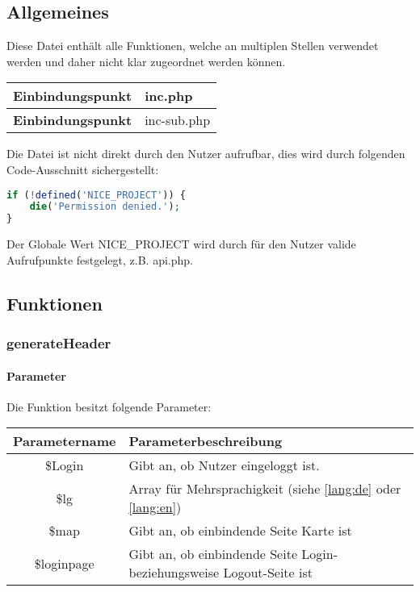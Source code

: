 \subsection{Allgemeines} Diese Datei enthält alle Funktionen, welche an multiplen Stellen verwendet werden und daher nicht klar zugeordnet werden können.
\begin{table}[H]
	\begin{tabular}{|c|p{11cm}|}
		\hline
		\textbf{Einbindungspunkt} & inc.php \\ \hline
		\textbf{Einbindungspunkt} & inc-sub.php \\ \hline
	\end{tabular}
\end{table}
Die Datei ist nicht direkt durch den Nutzer aufrufbar, dies wird durch folgenden Code-Ausschnitt sichergestellt:
\begin{lstlisting}[language=php]
if (!defined('NICE_PROJECT')) {
	die('Permission denied.');
}
\end{lstlisting}
Der Globale Wert {\glqq NICE\_PROJECT\grqq} wird durch für den Nutzer valide Aufrufpunkte festgelegt, z.B. {\glqq api.php\grqq}.
\newpage
\subsection{Funktionen}
\subsubsection{generateHeader}
\paragraph{Parameter} Die Funktion besitzt folgende Parameter:
\begin{table}[H]
	\begin{tabular}{|c|p{11cm}|}
		\hline
		\textbf{Parametername} & \textbf{Parameterbeschreibung} \\ \hline
		\$Login     & Gibt an, ob Nutzer eingeloggt ist. \\ \hline
		\$lg        & Array für Mehrsprachigkeit (siehe \autoref{lang:de} oder \autoref{lang:en}) \\ \hline
		\$map       & Gibt an, ob einbindende Seite Karte ist \\ \hline
		\$loginpage & Gibt an, ob einbindende Seite Login- beziehungsweise Logout-Seite ist \\ \hline
	\end{tabular}
\end{table}
